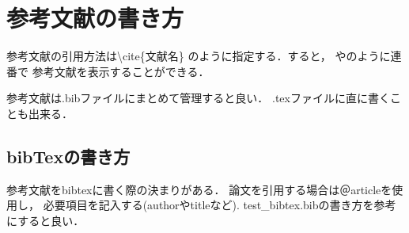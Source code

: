 \documentclass[a4j, twocolumn]{jsarticle}
\begin{document}
\section{参考文献の書き方}
参考文献の引用方法は\textbackslash cite\{文献名\}
のように指定する．すると，
\cite{ec_kui}や\cite{globus_toolkit}のように連番で
参考文献を表示することができる．

参考文献は.bibファイルにまとめて管理すると良い．
.texファイルに直に書くことも出来る．

\subsection{bibTexの書き方}
参考文献をbibtexに書く際の決まりがある．
論文を引用する場合は＠articleを使用し，
必要項目を記入する(authorやtitleなど).
test\_bibtex.bibの書き方を参考にすると良い．



\end{document}
